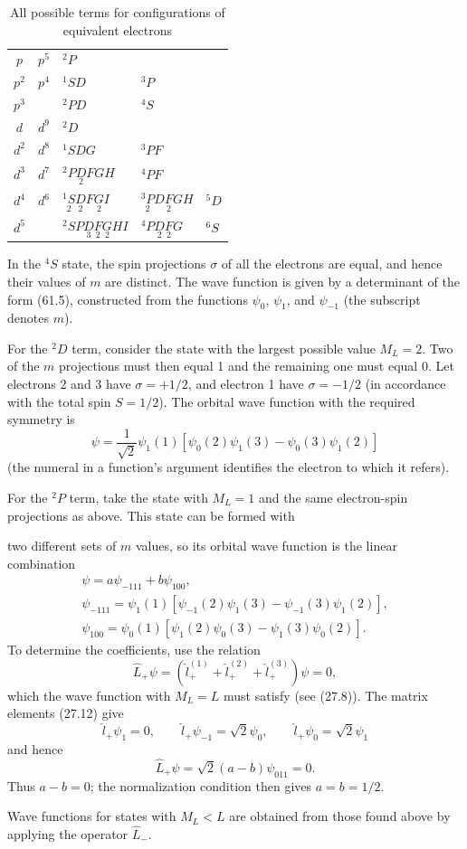 \begin{table}[ht]
\centering
\caption{All possible terms for configurations of equivalent electrons}
\begin{tabular}{c@{,\quad}c|lll}
$p$&$p^5$&${}^2P$&&\\
$p^2$&$p^4$&${}^1SD$&${}^3P$&\\
$p^3$&&${}^2PD$&${}^4S$&\\ \hline
$d$&$d^9$&${}^2D$&&\\
$d^2$&$d^8$&${}^1SDG$&${}^3PF$&\\
$d^3$&$d^7$&${}^2P\underset{2}{D}FGH$&${}^4PF$&\\
$d^4$&$d^6$&$\underset{2}{{}^1S}\underset{2}{D}F\underset{2}{G}I$
&$\underset{2}{{}^3P}D\underset{2}{F}GH$&${}^5D$\\
$d^5$&&${}^2SP\underset{3}{D}\underset{2}{F}\underset{2}{G}HI$
&${}^4P\underset{2}{D}\underset{2}{F}G$&${}^6S$
\end{tabular}
\end{table}



\SolutionHeading In the ${}^4S$ state, the spin projections $\sigma$ of all
the electrons are equal, and hence their values of $m$ are distinct. The wave
function is given by a determinant of the form (61.5), constructed from the
functions $\psi_0$, $\psi_1$, and $\psi_{-1}$ (the subscript denotes $m$).

For the ${}^2D$ term, consider the state with the largest possible value
$M_L=2$. Two of the $m$ projections must then equal 1 and the remaining one
must equal 0. Let electrons 2 and 3 have $\sigma=+1/2$, and electron 1 have
$\sigma=-1/2$ (in accordance with the total spin $S=1/2$). The orbital wave
function with the required symmetry is
\[
\psi=\frac1{\sqrt2}\psi_1(1)
[\psi_0(2)\psi_1(3)-\psi_0(3)\psi_1(2)]
\]
(the numeral in a function's argument identifies the electron to which it
refers).

For the ${}^2P$ term, take the state with $M_L=1$ and the same electron-spin
projections as above. This state can be formed with

two different sets of $m$ values, so its orbital wave function is the linear
combination
\[
\begin{gathered}
\psi=a\psi_{-111}+b\psi_{100},\\
\psi_{-111}=\psi_1(1)[\psi_{-1}(2)\psi_1(3)-\psi_{-1}(3)\psi_1(2)],\\
\psi_{100}=\psi_0(1)[\psi_1(2)\psi_0(3)-\psi_1(3)\psi_0(2)].
\end{gathered}
\]
To determine the coefficients, use the relation
\[
\hat L_+\psi=(\hat l_+^{(1)}+\hat l_+^{(2)}+\hat l_+^{(3)})\psi=0,
\]
which the wave function with $M_L=L$ must satisfy (see (27.8)). The matrix
elements (27.12) give
\[
\hat l_+\psi_1=0,\qquad \hat l_+\psi_{-1}=\sqrt2\psi_0,\qquad
\hat l_+\psi_0=\sqrt2\psi_1
\]
and hence
\[
\hat L_+\psi=\sqrt2(a-b)\psi_{011}=0.
\]
Thus $a-b=0$; the normalization condition then gives $a=b=1/2$.

Wave functions for states with $M_L<L$ are obtained from those found above
by applying the operator $\hat L_-$.
